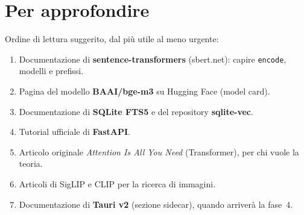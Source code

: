 \documentclass[11pt,a4paper]{article}
\newcommand{\code}[1]{\texttt{\small #1}}
\begin{document}
\section{Per approfondire}

Ordine di lettura suggerito, dal più utile al meno urgente:
\begin{enumerate}
  \item Documentazione di \textbf{sentence-transformers} (sbert.net): capire \code{encode}, modelli e prefissi.
  \item Pagina del modello \textbf{BAAI/bge-m3} su Hugging Face (model card).
  \item Documentazione di \textbf{SQLite FTS5} e del repository \textbf{sqlite-vec}.
  \item Tutorial ufficiale di \textbf{FastAPI}.
  \item Articolo originale \emph{Attention Is All You Need} (Transformer), per chi vuole la teoria.
  \item Articoli di SigLIP e CLIP per la ricerca di immagini.
  \item Documentazione di \textbf{Tauri v2} (sezione sidecar), quando arriverà la fase~4.
\end{enumerate}
\end{document}
